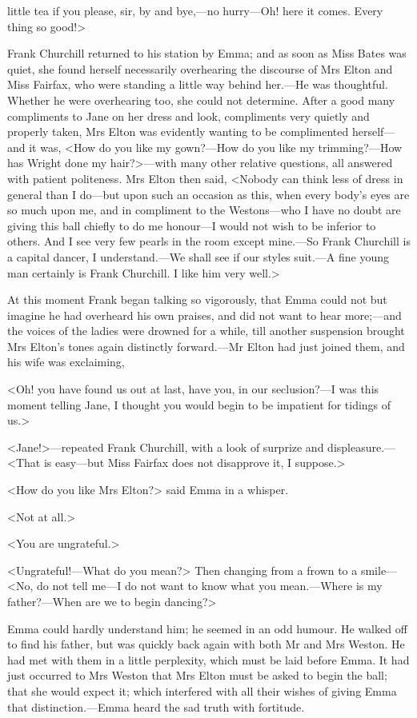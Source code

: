 little tea if you please, sir, by and bye,—no hurry—Oh! here it comes. Every thing so good!>

Frank Churchill returned to his station by Emma; and as soon as Miss Bates was quiet, she found herself necessarily overhearing the discourse of Mrs Elton and Miss Fairfax, who were standing a little way behind her.—He was thoughtful. Whether he were overhearing too, she could not determine. After a good many compliments to Jane on her dress and look, compliments very quietly and properly taken, Mrs Elton was evidently wanting to be complimented herself—and it was, <How do you like my gown?—How do you like my trimming?—How has Wright done my hair?>—with many other relative questions, all answered with patient politeness. Mrs Elton then said, <Nobody can think less of dress in general than I do—but upon such an occasion as this, when every body's eyes are so much upon me, and in compliment to the Westons—who I have no doubt are giving this ball chiefly to do me honour—I would not wish to be inferior to others. And I see very few pearls in the room except mine.—So Frank Churchill is a capital dancer, I understand.—We shall see if our styles suit.—A fine young man certainly is Frank Churchill. I like him very well.>



At this moment Frank began talking so vigorously, that Emma could not but imagine he had overheard his own praises, and did not want to hear more;—and the voices of the ladies were drowned for a while, till another suspension brought Mrs Elton's tones again distinctly forward.—Mr Elton had just joined them, and his wife was exclaiming,

<Oh! you have found us out at last, have you, in our seclusion?—I was this moment telling Jane, I thought you would begin to be impatient for tidings of us.>

<Jane!>—repeated Frank Churchill, with a look of surprize and displeasure.—<That is easy—but Miss Fairfax does not disapprove it, I suppose.>

<How do you like Mrs Elton?> said Emma in a whisper.

<Not at all.>

<You are ungrateful.>

<Ungrateful!—What do you mean?> Then changing from a frown to a smile—<No, do not tell me—I do not want to know what you mean.—Where is my father?—When are we to begin dancing?>

Emma could hardly understand him; he seemed in an odd humour. He walked off to find his father, but was quickly back again with both Mr and Mrs Weston. He had met with them in a little perplexity, which must be laid before Emma. It had just occurred to Mrs Weston that Mrs Elton must be asked to begin the ball; that she would expect it; which interfered with all their wishes of giving Emma that distinction.—Emma heard the sad truth with fortitude.

